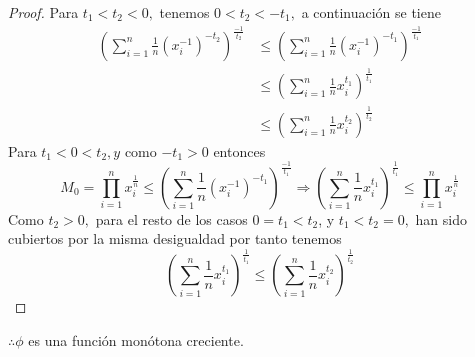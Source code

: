 \documentclass[a4paper,12pt]{article}
\begin{document}
\begin{enumerate}{}
\begin{proof}
Para $t_1<t_2<0,$ tenemos $0<t_2<-t_1,$ a continuación se tiene
$$
\begin{aligned}
\left(\sum_{i=1}^{n} \frac{1}{n}\left(x_{i}^{-1}\right)^{-t_2}\right)^{\frac{-1}{t_2}} & \leq\left(\sum_{i=1}^{n} \frac{1}{n}\left(x_{i}^{-1}\right)^{-t_1}\right)^{\frac{-1}{t_1}} \\
& \leq\left(\sum_{i=1}^{n} \frac{1}{n} x_{i}^{t_1}\right)^{\frac{1}{t_1}} \\
& \leq\left(\sum_{i=1}^{n} \frac{1}{n} x_{i}^{t_2}\right)^{\frac{1}{t_2}}
\end{aligned}
$$
Para $t_1<0<t_2, y$ como $-t_1>0$ entonces
$$
M_{0}=\prod_{i=1}^{n} x_{i}^{\frac{1}{n}} \leq\left(\sum_{i=1}^{n} \frac{1}{n}\left(x_{i}^{-1}\right)^{-t_1}\right)^{\frac{-1}{t_1}} \Rightarrow\left(\sum_{i=1}^{n} \frac{1}{n} x_{i}^{t_1}\right)^{\frac{1}{t_1}} \leq \prod_{i=1}^{n} x_{i}^{\frac{1}{n}}
$$
Como $t_2>0,$ para el resto de los casos $0=t_1<t_2$, y $t_1<t_2=0,$ han sido cubiertos por
la misma desigualdad por tanto tenemos
$$
\left(\sum_{i=1}^{n} \frac{1}{n} x_{i}^{t_1}\right)^{\frac{1}{t_1}} \leq\left(\sum_{i=1}^{n} \frac{1}{n} x_{i}^{t_2}\right)^{\frac{1}{t_2}}
$$
    \end{proof}
\begin{center}
    $\therefore \phi$ es una función monótona creciente.
\end{center}
\end{enumerate}



\end{document}
